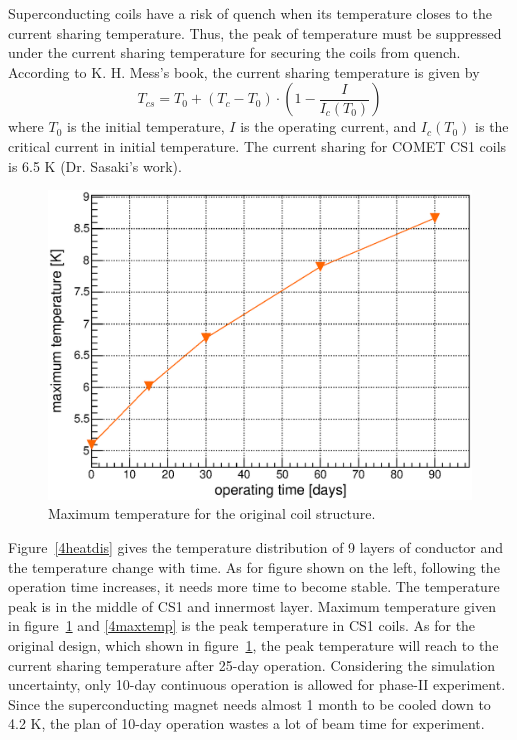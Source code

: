 Superconducting coils have a risk of quench when its temperature closes to the current sharing temperature.
Thus, the peak of temperature must be suppressed under the current sharing temperature for securing the coils from quench.
According to K. H. Mess's book, the current sharing temperature is given by
\begin{equation}
 T_{cs} = T_0 + (T_c - T_0)\cdot (1 - \frac{I}{I_c(T_0)})
\end{equation}
where $T_0$ is the initial temperature, $I$ is the operating current, and $I_c(T_0)$ is the critical current in initial temperature.
The current sharing for COMET CS1 coils is 6.5 K (Dr. Sasaki's work).
\begin{figure}[H]
 \centering
 \includegraphics[scale=0.43]{chapter5/fig/temp.eps}
 \caption{ Maximum temperature for the original coil structure.}
 \label{origin}
\end{figure}
Figure~\ref{4heatdis} gives the temperature distribution of 9 layers of conductor and the temperature change with time.
As for figure shown on the left, following the operation time increases, it needs more time to become stable.
The temperature peak is in the middle of CS1 and innermost layer.
Maximum temperature given in figure~\ref{origin} and \ref{4maxtemp} is the peak temperature in CS1 coils.
As for the original design, which shown in figure~\ref{origin}, the peak temperature will reach to the current sharing temperature after 25-day operation.
Considering the simulation uncertainty, only 10-day continuous operation is allowed for phase-II experiment.
Since the superconducting magnet needs almost 1 month to be cooled down to 4.2 K, the plan of 10-day operation wastes a lot of beam time for experiment.
